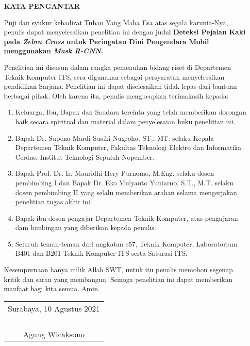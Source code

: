 \begin{center}
  \Large
  \textbf{KATA PENGANTAR}
\end{center}


Puji dan syukur kehadirat Tuhan Yang Maha Esa atas segala karunia-Nya, penulis  dapat menyelesaikan penelitian ini dengan judul \textbf{Deteksi Pejalan Kaki pada \textit{Zebra Cross} untuk Peringatan Dini Pengendara Mobil menggunakan \textit{Mask R-CNN}.}

Penelitian ini disusun dalam rangka pemenuhan bidang riset di Departemen Teknik Komputer ITS, sera digunakan sebagai persyaratan menyelesaikan pendidikan Sarjana. Penelitian ini dapat diselesaikan tidak lepas dari bantuan berbagai pihak. Oleh karena itu, penulis mengucapkan terimakasih kepada:

\begin{enumerate}[nolistsep]
  \item Keluarga, Ibu, Bapak dan Saudara tercinta yang telah memberikan dorongan baik secara spiritual dan material dalam penyelesaian buku penelitian ini.
  \item Bapak Dr. Supeno Mardi Susiki Nugroho, ST., MT. selaku Kepala Departemen Teknik Komputer, Fakultas Teknologi Elektro dan Informatika Cerdas, Institut Teknologi Sepuluh Nopember. 
  \item Bapak Prof. Dr. Ir. Mauridhi Hery Purnomo, M.Eng. selaku dosen pembimbing I dan Bapak Dr. Eko Mulyanto Yuniarno, S.T., M.T. selaku dosen pembimbing II yang selalu memberikan arahan selama mengerjakan penelitian tugas akhir ini.
  \item Bapak-ibu dosen pengajar Departemen Teknik Komputer, atas pengajaran dam bimbingan yang diberikan kepada penulis.
  \item Seluruh teman-teman dari angkatan e57, Teknik Komputer, Laboratorium B401 dan B201 Teknik Komputer ITS serta Saturasi ITS.
\end{enumerate}

Kesempurnaan hanya milik Allah SWT, untuk itu penulis memohon segenap kritik dan saran yang membangun. Semoga penelitian ini dapat memberikan manfaat bagi kita semua. Amin.


\begin{flushright}
  \begin{tabular}[b]{c}
    Surabaya, 10 Agustus 2021\\
    \\
    \\
    \\
    \\
    Agung Wicaksono
  \end{tabular}
\end{flushright}
